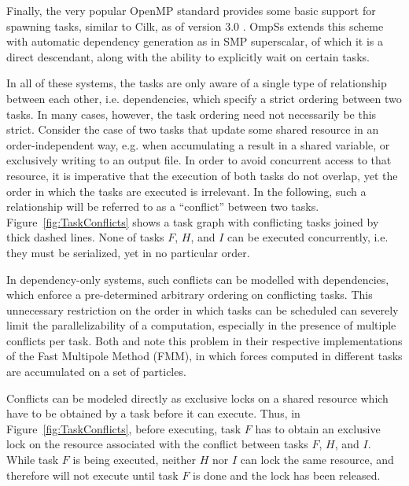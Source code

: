 \documentclass[preprint]{elsarticle}
\newcommand{\fig}[1]
    {Figure~\ref{fig:#1}}
\begin{document}
Finally, the very popular OpenMP standard provides some basic support
for spawning tasks, similar to Cilk, as of version 3.0
\cite{ref:OpenMP2008}.
OmpSs \cite{ref:Duran2011} extends this scheme with automatic
dependency generation as in SMP superscalar, of which it
is a direct descendant, along with
the ability to explicitly wait on certain tasks.

In all of these systems, the tasks are only aware of a single
type of relationship between each other, i.e. dependencies, which
specify a strict ordering between two tasks.
In many cases, however, the task ordering need not necessarily
be this strict.
Consider the case of two tasks that update some shared resource
in an order-independent way, e.g. when accumulating a result in
a shared variable, or exclusively writing to an output file.
In order to avoid concurrent access to that resource, it is
imperative that the execution of both tasks do not overlap,
yet the order in which the tasks are executed is irrelevant.
In the following, such a relationship will be referred to
as a ``conflict'' between two tasks.
\fig{TaskConflicts} shows a task graph with conflicting tasks
joined by thick dashed lines.
None of tasks $F$, $H$, and $I$ can be executed concurrently,
i.e. they must be serialized, yet in no particular order.

In dependency-only systems, such conflicts can be modelled
with dependencies, which enforce a pre-determined arbitrary
ordering on conflicting tasks.
This unnecessary restriction on the order
in which tasks can be scheduled can severely limit the
parallelizability of a computation, especially in the presence
of multiple conflicts per task.
Both \cite{ref:Ltaief2012} and \cite{ref:Agullo2013} note
this problem in their respective implementations of the Fast Multipole
Method (FMM), in which forces computed in different tasks are
accumulated on a set of particles.

Conflicts can be modeled directly as exclusive locks on a shared resource
which have to be obtained by a task before it can execute.
Thus, in \fig{TaskConflicts}, before executing, task $F$ has
to obtain an exclusive lock on the resource associated with
the conflict between tasks $F$, $H$, and $I$.
While task $F$ is being executed, neither $H$ nor $I$ can 
lock the same resource, and therefore will not execute until
task $F$ is done and the lock has been released.
\end{document}

